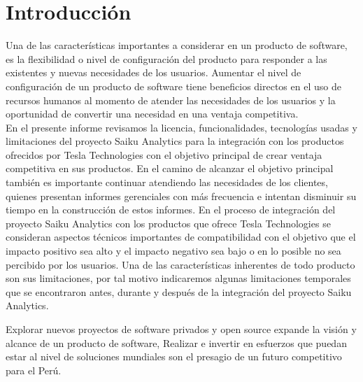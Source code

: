 \clearpage
{}
{}

\chapter*{Introducción}
\begin{spacing}{1.5}
	Una de las características importantes a considerar en un producto de software, es la flexibilidad o nivel de configuración del producto para responder a las existentes y nuevas necesidades de los usuarios. Aumentar el nivel de configuración de un producto de software tiene beneficios directos en el uso de recursos humanos al momento de atender las necesidades de los usuarios y la oportunidad de convertir una necesidad en una ventaja competitiva.\\
	
	En el presente informe revisamos la licencia, funcionalidades, tecnologías usadas y limitaciones del proyecto Saiku Analytics para la integración con los productos ofrecidos por Tesla Technologies con el objetivo principal de crear ventaja competitiva en sus productos.
	En el camino de alcanzar el objetivo principal también es importante continuar atendiendo las necesidades de los clientes, quienes presentan informes gerenciales con más frecuencia e intentan disminuir su tiempo en la construcción de estos informes.
	En el proceso de integración del proyecto Saiku Analytics con los productos que ofrece Tesla Technologies se consideran aspectos técnicos importantes de compatibilidad con el objetivo que el impacto positivo sea alto y el impacto negativo sea bajo o en lo posible no sea percibido por los usuarios. 
	Una de las características inherentes de todo producto son sus limitaciones, por tal motivo indicaremos algunas limitaciones temporales que se encontraron antes, durante y después de la integración del proyecto Saiku Analytics.
	
	Explorar nuevos proyectos de software privados y open source expande la visión y alcance de un producto de software, Realizar e invertir en esfuerzos que puedan estar al nivel de soluciones mundiales son el presagio de un futuro competitivo para el Perú.
\end{spacing}

